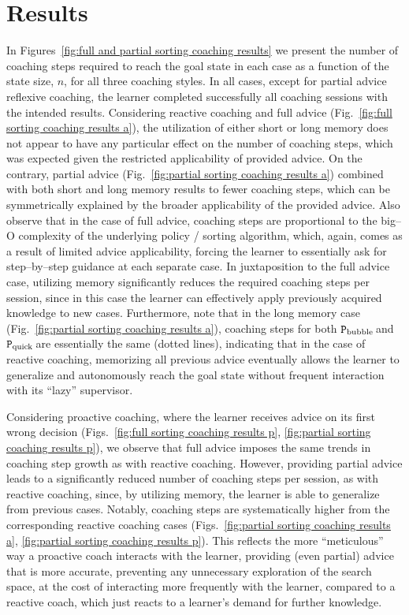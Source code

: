 \documentclass[a4paper,twoside]{article}
\newcommand{\bubblecoach}{\ensuremath{\texttt{P}_{\rm bubble}}\,}
\newcommand{\quickcoach}{\ensuremath{\texttt{P}_{\rm quick}}\,}
\begin{document}
\section{Results}\label{subsec:sorting-results}
%
In Figures~\ref{fig:full and partial sorting coaching results} we present the number of coaching steps required to reach the goal state in each case as a function of the state size, $n$, for all three coaching styles. In all cases, except for partial advice reflexive coaching, the learner completed successfully all coaching sessions with the intended results. Considering reactive coaching and full advice (Fig.~\ref{fig:full sorting coaching results a}), the utilization of either short or long memory does not appear to have any particular effect on the number of coaching steps, which was expected given the restricted applicability of provided advice. On the contrary, partial advice (Fig.~\ref{fig:partial sorting coaching results a}) combined with both short and long memory results to fewer coaching steps, which can be symmetrically explained by the broader applicability of the provided advice. Also observe that in the case of full advice, coaching steps are proportional to the big--O complexity of the underlying policy / sorting algorithm, which, again, comes as a result of limited advice applicability, forcing the learner to essentially ask for step--by--step guidance at each separate case. In juxtaposition to the full advice case, utilizing memory significantly reduces the required coaching steps per session, since in this case the learner can effectively apply previously acquired knowledge to new cases. Furthermore, note that in the long memory case (Fig.~\ref{fig:partial sorting coaching results a}), coaching steps for both \bubblecoach and \quickcoach are essentially the same (dotted lines), indicating that in the case of reactive coaching, memorizing all previous advice eventually allows the learner to generalize and autonomously reach the goal state without frequent interaction with its ``lazy'' supervisor.

Considering proactive coaching, where the learner receives advice on its first wrong decision (Figs.~\ref{fig:full sorting coaching results p}, \ref{fig:partial sorting coaching results p}), we observe that full advice imposes the same trends in coaching step growth as with reactive coaching. However, providing partial advice leads to a significantly reduced number of coaching steps per session, as with reactive coaching, since, by utilizing memory, the learner is able to generalize from previous cases. Notably, coaching steps are systematically higher from the corresponding reactive coaching cases (Figs.~\ref{fig:partial sorting coaching results a}, \ref{fig:partial sorting coaching results p}). This reflects the more ``meticulous'' way a proactive coach interacts with the learner, providing (even partial) advice that is more accurate, preventing any unnecessary exploration of the search space, at the cost of interacting more frequently with the learner, compared to a reactive coach, which just reacts to a learner's demand for further knowledge.
\end{document}
